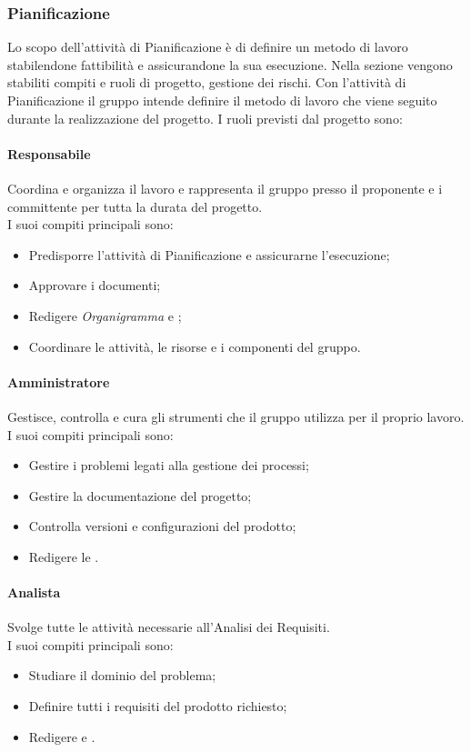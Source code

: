 \subsubsection{Pianificazione}
Lo scopo dell'attività di Pianificazione è di definire un metodo di lavoro stabilendone fattibilità e assicurandone la sua esecuzione.
Nella sezione vengono stabiliti compiti e ruoli di progetto, gestione dei rischi. 
Con l'attività di Pianificazione il gruppo intende definire il metodo di lavoro che viene seguito durante la realizzazione del progetto.
I ruoli previsti dal progetto sono:
\paragraph*{Responsabile}
Coordina e organizza il lavoro e rappresenta il gruppo presso il proponente e i committente per tutta la durata del progetto. \\
I suoi compiti principali sono:
\begin{itemize}
	\item Predisporre l'attività di Pianificazione e assicurarne l'esecuzione;
	\item Approvare i documenti;
	\item Redigere \textit{Organigramma} e \PdPv;
	\item Coordinare le attività, le risorse e i componenti del gruppo.
\end{itemize}

\paragraph*{Amministratore}
Gestisce, controlla e cura gli strumenti che il gruppo utilizza per il proprio lavoro. \\
I suoi compiti principali sono:
\begin{itemize}
	\item Gestire i problemi legati alla gestione dei processi;
	\item Gestire la documentazione del progetto;
	\item Controlla versioni e configurazioni del prodotto;
	\item Redigere le \NdPv.
\end{itemize}

\paragraph*{Analista}
Svolge tutte le attività necessarie all'Analisi dei Requisiti.\\
I suoi compiti principali sono:
\begin{itemize}
	\item Studiare il dominio del problema;
	\item Definire tutti i requisiti del prodotto richiesto;
	\item Redigere \SdFv e \AdRv.
\end{itemize}

